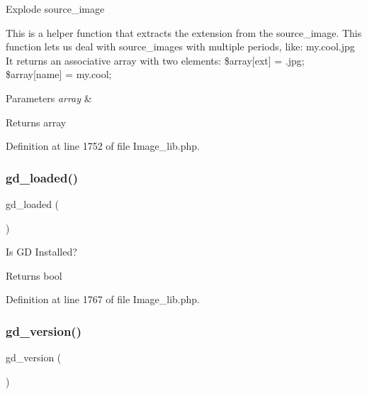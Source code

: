 Explode source\+\_\+image

This is a helper function that extracts the extension from the source\+\_\+image. This function lets us deal with source\+\_\+images with multiple periods, like\+: my.\+cool.\+jpg It returns an associative array with two elements\+: \$array\mbox{[}\textquotesingle{}ext\textquotesingle{}\mbox{]} = \textquotesingle{}.jpg\textquotesingle{}; \$array\mbox{[}\textquotesingle{}name\textquotesingle{}\mbox{]} = \textquotesingle{}my.\+cool\textquotesingle{};


\begin{DoxyParams}{Parameters}
{\em array} & \\
\hline
\end{DoxyParams}
\begin{DoxyReturn}{Returns}
array 
\end{DoxyReturn}


Definition at line 1752 of file Image\+\_\+lib.\+php.

\mbox{\label{class_c_i___image__lib_a04376d5530f38a1a61f59c2d769284ba}} 
\subsubsection{\texorpdfstring{gd\_loaded()}{gd\_loaded()}}
{\footnotesize\ttfamily gd\+\_\+loaded (\begin{DoxyParamCaption}{ }\end{DoxyParamCaption})}

Is GD Installed?

\begin{DoxyReturn}{Returns}
bool 
\end{DoxyReturn}


Definition at line 1767 of file Image\+\_\+lib.\+php.

\mbox{\label{class_c_i___image__lib_a7d141f85d677d5e6db12020009569fde}} 
\subsubsection{\texorpdfstring{gd\_version()}{gd\_version()}}
{\footnotesize\ttfamily gd\+\_\+version (\begin{DoxyParamCaption}{ }\end{DoxyParamCaption})}

